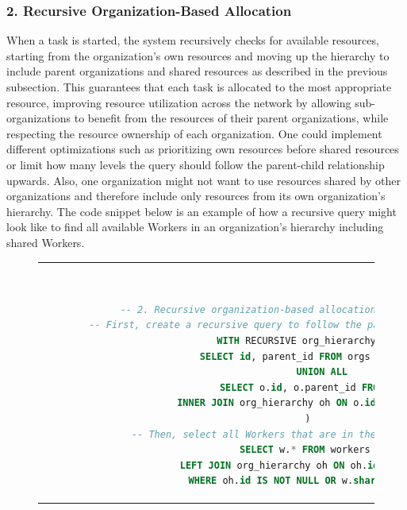 \subsubsection{2. Recursive Organization-Based Allocation}
    When a task is started, the system recursively checks for available resources, starting from the organization's own resources and moving up the hierarchy to include parent organizations and shared resources as described in the previous subsection. This guarantees that each task is allocated to the most appropriate resource, improving resource utilization across the network by allowing sub-organizations to benefit from the resources of their parent organizations, while respecting the resource ownership of each organization. One could implement different optimizations such as prioritizing own resources before shared resources or limit how many levels the query should follow the parent-child relationship upwards. Also, one organization might not want to use resources shared by other organizations and therefore include only resources from its own organization's hierarchy. The code snippet below is an example of how a recursive query might look like to find all available Workers in an organization's hierarchy including shared Workers.   

    \begin{figure}[htpb]
      \begin{tabular}{c}
      \ \small \begin{lstlisting}[language=SQL]
        -- 2. Recursive organization-based allocation example query
        -- First, create a recursive query to follow the parent-child hierarchy upward
        WITH RECURSIVE org_hierarchy AS (
            SELECT id, parent_id FROM orgs WHERE id = ?
            UNION ALL
            SELECT o.id, o.parent_id FROM orgs o
            INNER JOIN org_hierarchy oh ON o.id = oh.parent_id 
        ) 
        -- Then, select all Workers that are in the hierarchy or shared
        SELECT w.* FROM workers w
        LEFT JOIN org_hierarchy oh ON oh.id = w.org_id
        WHERE oh.id IS NOT NULL OR w.shared = true;
        \end{lstlisting}
      \end{tabular}
      \label{fig:recursive-allocation}
    \end{figure}

